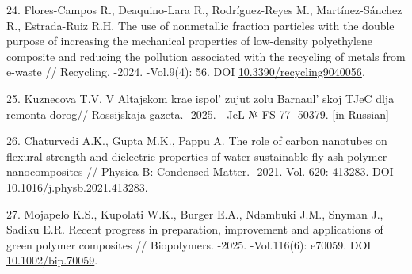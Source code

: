 \begin{refs}
24. Flores-Campos R., Deaquino-Lara R., Rodríguez-Reyes M.,
Martínez-Sánchez R., Estrada-Ruiz R.H. The use of nonmetallic fraction
particles with the double purpose of increasing the mechanical
properties of low-density polyethylene composite and reducing the
pollution associated with the recycling of metals from e-waste //
Recycling. -2024. -Vol.9(4): 56. DOI
\href{https://doi.org/10.3390/recycling9040056}{10.3390/recycling9040056}.

25. Kuznecova T.V. V Altajskom krae ispol' zujut zolu
Barnaul' skoj TJeC dlja remonta dorog// Rossijskaja
gazeta. -2025. - JeL № FS 77 -50379. {[}in Russian{]}

26. Chaturvedi A.K., Gupta M.K., Pappu A. The role of carbon nanotubes
on flexural strength and dielectric properties of water sustainable fly
ash polymer nanocomposites // Physica B: Condensed Matter. -2021.-Vol.
620: 413283. DOI 10.1016/j.physb.2021.413283.

27. Mojapelo K.S., Kupolati W.K., Burger E.A., Ndambuki J.M., Snyman J.,
Sadiku E.R. Recent progress in preparation, improvement and applications
of green polymer composites // Biopolymers. -2025. -Vol.116(6): e70059.
DOI \href{https://doi.org/10.1002/bip.70059}{10.1002/bip.70059}.
\end{refs}

